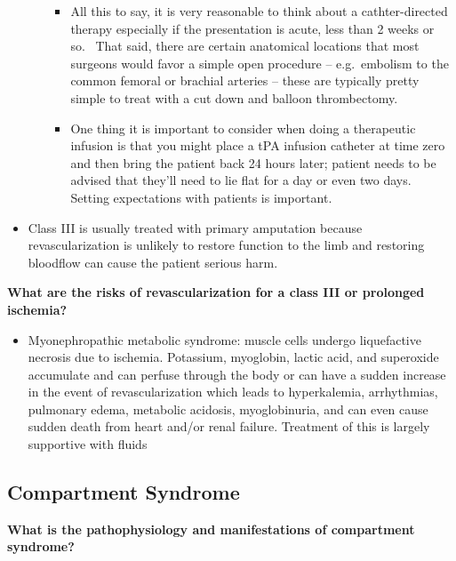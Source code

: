 \documentclass[
]{book}
\providecommand{\tightlist}{%
  \setlength{\itemsep}{0pt}\setlength{\parskip}{0pt}}
\begin{document}
\begin{itemize}
\begin{itemize}
    \begin{itemize}
    \item
      All this to say, it is very reasonable to think about a
      cathter-directed therapy especially if the presentation is
      acute, less than 2 weeks or so.~ That said, there are
      certain anatomical locations that most surgeons would favor
      a simple open procedure -- e.g.~embolism to the common
      femoral or brachial arteries -- these are typically pretty
      simple to treat with a cut down and balloon thrombectomy.~~
    \item
      One thing it is important to consider when doing a
      therapeutic infusion is that you might place a tPA infusion
      catheter at time zero and then bring the patient back 24
      hours later; patient needs to be advised that they'll need
      to lie flat for a day or even two days.~ Setting
      expectations with patients is important.
    \end{itemize}
  \end{itemize}
\item
  Class III is usually treated with primary amputation because
  revascularization is unlikely to restore function to the limb and
  restoring bloodflow can cause the patient serious harm.~
\end{itemize}

\textbf{What are the risks of revascularization for a class III or prolonged
ischemia?}

\begin{itemize}
\tightlist
\item
  Myonephropathic metabolic syndrome: muscle cells undergo
  liquefactive necrosis due to ischemia. Potassium, myoglobin, lactic
  acid, and superoxide accumulate and can perfuse through the body or
  can have a sudden increase in the event of revascularization which
  leads to hyperkalemia, arrhythmias, pulmonary edema, metabolic
  acidosis, myoglobinuria, and can even cause sudden death from heart
  and/or renal failure. \citep{obaraAcuteLimbIschemia2018} Treatment of
  this is largely supportive with fluids
\end{itemize}

\hypertarget{compartment-syndrome}{%
\subsection{Compartment Syndrome}\label{compartment-syndrome}}

\textbf{What is the pathophysiology and manifestations of compartment
syndrome?}
\end{document}
